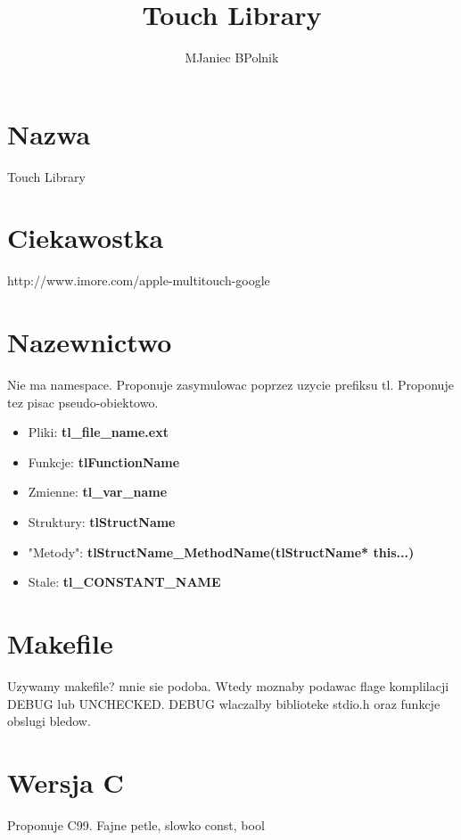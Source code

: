 \documentclass[10pt,a4paper]{article}
\author{MJaniec BPolnik}
\title{Touch Library}
\begin{document}
\maketitle

\section{Nazwa}
Touch Library

\section{Ciekawostka}
http://www.imore.com/apple-multitouch-google


\section{Nazewnictwo}
Nie ma namespace. Proponuje zasymulowac poprzez uzycie prefiksu tl.
Proponuje tez pisac pseudo-obiektowo. 
\begin{itemize}
	\item Pliki: \textbf{tl_file_name.ext}
	\item Funkcje: \textbf{tlFunctionName}
	\item Zmienne: \textbf{tl_var_name}
	\item Struktury: \textbf{tlStructName}
	\item "Metody": \textbf{tlStructName_MethodName(tlStructName* this...)}
	\item Stale: \textbf{tl_CONSTANT_NAME} 
\end{itemize}

\section{Makefile}
Uzywamy makefile? mnie sie podoba.
Wtedy moznaby podawac flage komplilacji DEBUG lub UNCHECKED.
DEBUG wlaczalby biblioteke stdio.h oraz funkcje obslugi bledow. 

\section{Wersja C}
Proponuje C99. Fajne petle, slowko const, bool
\end{document}
